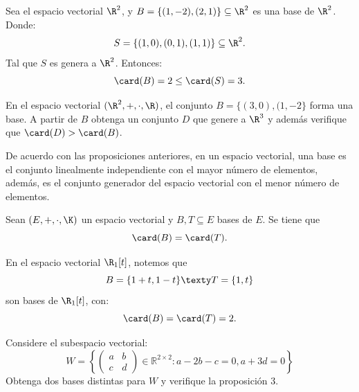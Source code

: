 \documentclass[compacto,10pt]{pubciencias-notas}
\begin{document}
\begin{ejem}\hspace{0pt}
Sea el espacio vectorial $\R^{2}$, y $B = \{(1,-2),(2, 1)\}\subseteq\R^{2}$ es una base de $\R^{2}$. Donde:
    \[
        S= \{(1, 0),(0, 1),(1,1)\}\subseteq\R^{2}.
    \]
Tal que $S$ es genera a $\R^{2}$. Entonces:
     \[
        \card(B)=2\leq \card(S)=3.
    \]
\end{ejem}


\begin{ejer}\hspace{0pt}
En el espacio vectorial $(\R^{2},+,\cdot,\R)$, el conjunto $B=\{(3,0), (1,-2\}$ forma una base. A partir de $B$ obtenga un conjunto $D$ que genere a $\R^{3}$ y además verifique que $\card(D) > \card(B)$.
\end{ejer}

\begin{obs}\label{ObsBase}
De acuerdo con las proposiciones anteriores, en un espacio vectorial, una base es el conjunto linealmente independiente con el mayor número de elementos, además, es el conjunto generador del espacio vectorial con el menor número de elementos.
\end{obs}

\begin{prop}
Sean $(E,+,\cdot,\K)$ un espacio vectorial y $B,T\subseteq E$ bases de $E$. Se tiene que
    \[
        \card(B) = \card(T).
    \]
\end{prop}

\begin{ejem}\hspace{0pt}
En el espacio vectorial $\R_1 [t]$, notemos que 
\[
    B = \{1+t,1-t\} \texty T = \{1,t\}
\]
son bases de $\R_1 [t]$, con:
\[
    \card(B) = \card(T)=2.
\]
\end{ejem}

\begin{ejer}\hspace{0pt}
Considere el subespacio vectorial:
\[W=\left\{\begin{pmatrix} a & b\\ c & d\end{pmatrix} \in \mathbb{R}^{2\times 2} : a -2b -c = 0, a+3d=0 \right\}\]
Obtenga dos bases distintas para $W$ y verifique la proposición 3.
\end{ejer}
\end{document}
